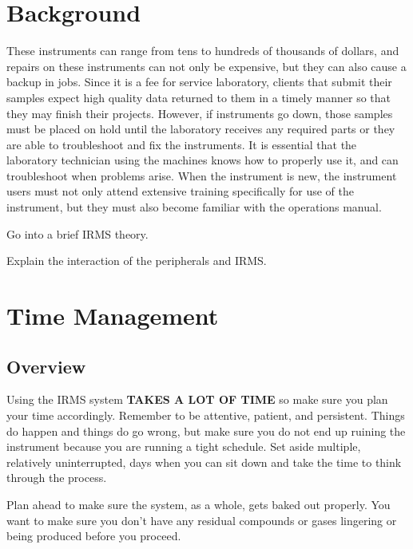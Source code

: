 \documentclass[12pt]{../SOP3_beta}\usepackage[]{graphicx}\usepackage[]{color}
\begin{document}

\section{Background}

These instruments can range from tens to hundreds of thousands of dollars, and repairs on these instruments can not only be expensive, but they can also cause a backup in jobs. Since it is a fee for service laboratory, clients that submit their samples expect high quality data returned to them in a timely manner so that they may finish their projects. However, if instruments go down, those samples must be placed on hold until the laboratory receives any required parts or they are able to troubleshoot and fix the instruments. It is essential that the laboratory technician using the machines knows how to properly use it, and can troubleshoot when problems arise. When the instrument is new, the instrument users must not only attend extensive training specifically for use of the instrument, but they must also become familiar with the operations manual.

Go into a brief IRMS theory.

Explain the interaction of the peripherals and IRMS.

\section{Time Management}

\subsection{Overview}

\NP Using the IRMS system \textbf{TAKES A LOT OF TIME} so make sure you plan your time accordingly. Remember to be attentive, patient, and persistent. Things do happen and things do go wrong, but make sure you do not end up ruining the instrument because you are running a tight schedule. Set aside multiple, relatively uninterrupted, days when you can sit down and take the time to think through the process.

\NP Plan ahead to make sure the system, as a whole, gets baked out properly. You want to make sure you don't have any residual compounds or gases lingering or being produced before you proceed.
\end{document}
